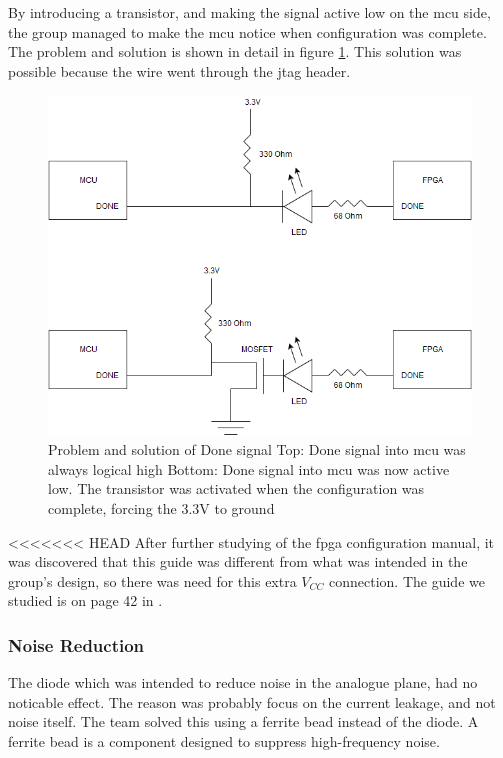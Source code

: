By introducing a transistor, and making the signal active low on the \gls{mcu} side, the group managed to make the \gls{mcu} notice when configuration was complete.
The problem and solution is shown in detail in figure \ref{fig:Done Issue}.
This solution was possible because the wire went through the \gls{jtag} header.

\begin{figure}[h!]
\centering
\includegraphics[scale=0.5]{images/Done_Signal_Issue.png}
\caption{Problem and solution of Done signal
         \newline
         Top: Done signal into \gls{mcu} was always logical high
         \newline
         Bottom: Done signal into \gls{mcu} was now active low. The transistor was activated when the configuration was complete, forcing the 3.3V to ground}
\label{fig:Done Issue}
\end{figure}

<<<<<<< HEAD
After further studying of the \gls{fpga} configuration manual, it was discovered that this guide was different from what was intended in the group's design, so there was need for this extra \(V_{CC}\) connection. The guide we studied is on page 42 in \cite{fpga-configuration}.

\subsubsection{Noise Reduction}
The diode which was intended to reduce noise in the analogue plane, had no noticable effect. 
The reason was probably focus on the current leakage, and not noise itself. 
The team solved this using a ferrite bead instead of the diode. 
A ferrite bead is a component designed to suppress high-frequency noise. 

